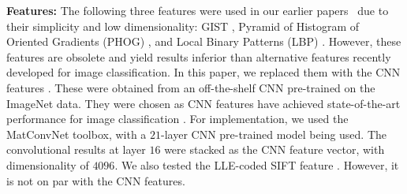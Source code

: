 \documentclass[preprint,12pt,3p]{elsarticle}
\begin{document}










\textbf{Features:} The following three features were used in our
earlier papers~\citep{dai:eccv12b, dai:iccv13b} due to their simplicity and low dimensionality: GIST
\citep{gist}, Pyramid of Histogram of Oriented Gradients (PHOG)
\citep{Bosch:iccv07}, and Local Binary Patterns (LBP)
\citep{Ojala02}. However, these features are obsolete and yield
 results inferior than alternative features recently developed  for image
classification. 
In this paper, we replaced them with the CNN features \citep{caffe14, deep:bmvc14}. 
These were obtained from an off-the-shelf CNN pre-trained on the ImageNet data. 
They were chosen as CNN features
have achieved state-of-the-art performance for image classification
\citep{nips12:cnn, cnnfet14}. For implementation, we used the
MatConvNet \citep{MatConvNet} toolbox, with a $21$-layer CNN
pre-trained model being used. The convolutional results at layer $16$ were
stacked as the CNN feature vector, with dimensionality of $4096$.  We
also tested the LLE-coded SIFT feature \citep{siftllc:cvpr10}. However,
it is not on par with the CNN features.
 
\end{document}
